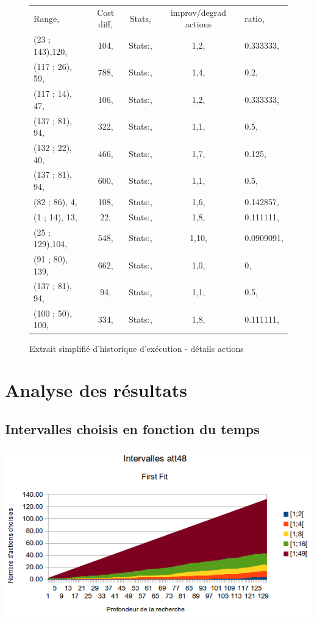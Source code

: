 \documentclass[a4paper,10pt]{report}
\begin{document}
\begin{figure}[h]
  \begin{tabular}{lcccl}
    Range,		&Cost diff,	
				&Stats,	&improv/degrad actions	&ratio,\\
    (23  ; 143),120,	&104,	&Stats:,	&1,2,		&0.333333,\\
    (117 ; 26),  59,	&788,	&Stats:,	&1,4,		&0.2,\\
    (117 ; 14),  47,	&106,	&Stats:,	&1,2,		&0.333333,\\
    (137 ; 81),  94,	&322,	&Stats:,	&1,1,		&0.5,\\
    (132 ; 22),  40,	&466,	&Stats:,	&1,7,		&0.125,\\
    (137 ; 81),  94,	&600,	&Stats:,	&1,1,		&0.5,\\
    (82  ; 86),   4,	&108,	&Stats:,	&1,6,		&0.142857,\\
    (1   ; 14),  13,	&22,	&Stats:,	&1,8,		&0.111111,\\
    (25  ; 129),104,	&548,	&Stats:,	&1,10,		&0.0909091,\\
    (91  ; 80), 139,	&662,	&Stats:,	&1,0,		&0,\\
    (137 ; 81),  94,	&94,	&Stats:,	&1,1,		&0.5,\\
    (100 ; 50), 100,	&334,	&Stats:,	&1,8,		&0.111111,\\
  \end{tabular}
  \label{a280-sample-interval-simple-bis}
  \caption{Extrait simplifié d'historique d'exécution - détails actions}
\end{figure}


\pagebreak
\section{Analyse des résultats}

\subsection{Intervalles choisis en fonction du temps}
\paragraph{}

\begin{center}
  \includegraphics[width=\textwidth]{images/att48-intervals-first-fit.png}
\end{center}
\end{document}
